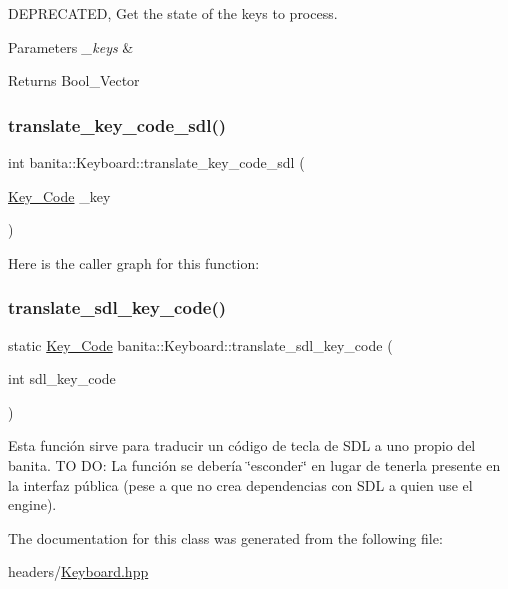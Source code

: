 D\+E\+P\+R\+E\+C\+A\+T\+ED, Get the state of the keys to process. 


\begin{DoxyParams}{Parameters}
{\em \+\_\+keys} & \\
\hline
\end{DoxyParams}
\begin{DoxyReturn}{Returns}
Bool\+\_\+\+Vector 
\end{DoxyReturn}
\mbox{\label{classbanita_1_1_keyboard_afba73737bfad5061446a38a5a925cbfe}} 
\subsubsection{\texorpdfstring{translate\_key\_code\_sdl()}{translate\_key\_code\_sdl()}}
{\footnotesize\ttfamily int banita\+::\+Keyboard\+::translate\+\_\+key\+\_\+code\+\_\+sdl (\begin{DoxyParamCaption}\item[{\mbox{\hyperlink{classbanita_1_1_keyboard_a0dee214e6cb4f246866603b85568b9ab}{Key\+\_\+\+Code}}}]{\+\_\+key }\end{DoxyParamCaption})}

Here is the caller graph for this function\+:
\mbox{\label{classbanita_1_1_keyboard_ae0d0b78dbb5407e23fa2135be19bf903}} 
\subsubsection{\texorpdfstring{translate\_sdl\_key\_code()}{translate\_sdl\_key\_code()}}
{\footnotesize\ttfamily static \mbox{\hyperlink{classbanita_1_1_keyboard_a0dee214e6cb4f246866603b85568b9ab}{Key\+\_\+\+Code}} banita\+::\+Keyboard\+::translate\+\_\+sdl\+\_\+key\+\_\+code (\begin{DoxyParamCaption}\item[{int}]{sdl\+\_\+key\+\_\+code }\end{DoxyParamCaption})\hspace{0.3cm}{\ttfamily [static]}}

Esta función sirve para traducir un código de tecla de S\+DL a uno propio del banita. TO DO\+: La función se debería \char`\"{}esconder\char`\"{} en lugar de tenerla presente en la interfaz pública (pese a que no crea dependencias con S\+DL a quien use el engine). 

The documentation for this class was generated from the following file\+:\begin{DoxyCompactItemize}
\item 
headers/\mbox{\hyperlink{_keyboard_8hpp}{Keyboard.\+hpp}}\end{DoxyCompactItemize}
